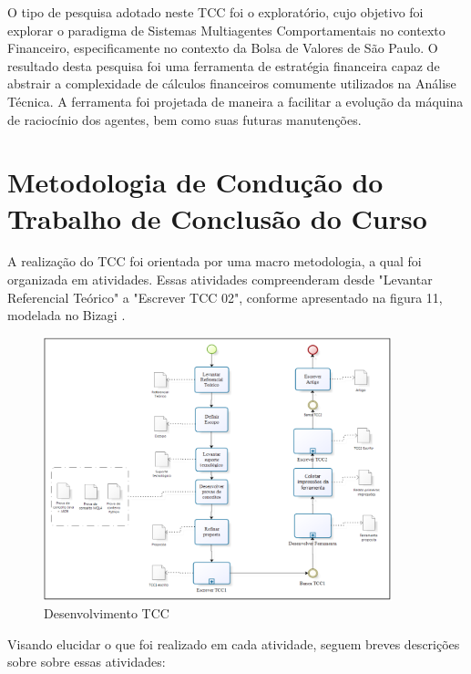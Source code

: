 O tipo de pesquisa adotado neste TCC foi o exploratório, cujo objetivo foi explorar o paradigma de Sistemas Multiagentes Comportamentais no contexto Financeiro, especificamente no contexto da Bolsa de Valores de São Paulo. O resultado desta pesquisa foi uma ferramenta de estratégia financeira capaz de abstrair a complexidade de cálculos financeiros comumente utilizados na Análise Técnica. A ferramenta foi projetada de maneira a facilitar a evolução da máquina de raciocínio dos agentes, bem como suas futuras manutenções. 


\section{Metodologia de Condução do Trabalho de Conclusão do Curso}

A realização do TCC foi orientada por uma macro metodologia, a qual foi organizada em atividades.
Essas atividades compreenderam desde "Levantar Referencial Teórico" a "Escrever TCC 02", conforme apresentado na figura 11, modelada no Bizagi \textcopyright.
\begin{figure}[h]
\centering
\label{f11}
\includegraphics[width=0.9\textwidth]{figuras/f27}
\caption{Desenvolvimento TCC}
\end{figure}
Visando elucidar o que foi realizado em cada atividade, seguem breves descrições sobre sobre essas atividades:

